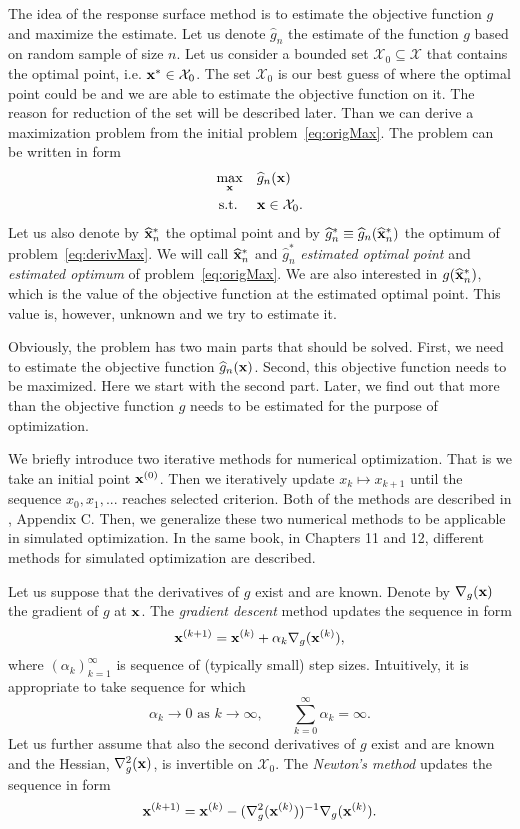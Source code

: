 The idea of the response surface method is to estimate the objective function $g$ and maximize the estimate. Let us denote $\widehat{g}_n$ the estimate of the function $g$ based on random sample of size $n$. Let us consider a bounded set $\mathcal{X}_0 \subseteq \mathcal{X}$ that contains the optimal point, i.e. $\mathbf{x}^{*} \in \mathcal{X}_0$. The set $\mathcal{X}_0$ is our best guess of where the optimal point could be and we are able to estimate the objective function on it. The reason for reduction of the set will be described later. Than we can derive a maximization problem from the initial problem~\eqref{eq:origMax}. The problem can be written in form
\begin{equation}
	\label{eq:derivMax}
	\begin{aligned}
		& \underset{\mathbf{x}}{\max} & & \widehat{g}_n (\mathbf{x}) \\
		& \operatorname{\textrm{s.t.}} & & \mathbf{x} \in \mathcal{X}_0.
	\end{aligned}
\end{equation}
Let us also denote by $\widehat{\mathbf{x}}^{*}_n$ the optimal point and by $ \widehat{g}^{*}_n \equiv \widehat{g}_n (\widehat{\mathbf{x}}^{*}_n)$ the optimum of problem~\eqref{eq:derivMax}. We will call $\widehat{\mathbf{x}}^{*}_n$ and $\widehat{g}^{*}_n$ \emph{estimated optimal point} and \emph{estimated optimum} of problem~\eqref{eq:origMax}. We are also interested in $g (\widehat{\mathbf{x}}^{*}_n)$, which is the value of the objective function at the estimated optimal point. This value is, however, unknown and we try to estimate it.

Obviously, the problem has two main parts that should be solved. First, we need to estimate the objective function $\widehat{g}_n (\mathbf{x})$. Second, this objective function needs to be maximized. Here we start with the second part. Later, we find out that more than the objective function $g$ needs to be estimated for the purpose of optimization.

We briefly introduce two iterative methods for numerical optimization. That is we take an initial point $\mathbf{x}^{(0)}$. Then we iteratively update $x_k \mapsto x_{k+1}$ until the sequence $x_0, x_1, ...$ reaches selected criterion. Both of the methods are described in \cite{Kroese11}, Appendix C. Then, we generalize these two numerical methods to be applicable in simulated optimization. In the same book, in Chapters 11 and 12, different methods for simulated optimization are described. 

Let us suppose that the derivatives of $g$ exist and are known. Denote by $\nabla_{g} (\mathbf{x})$ the gradient of $g$ at $\mathbf{x}$. The \emph{gradient descent} method updates the sequence in form
\[
	\mathbf{x}^{(k+1)} = \mathbf{x}^{(k)} + \alpha_k \nabla_{g} (\mathbf{x}^{(k)}),
\]
where $(\alpha_k)_{k=1}^{\infty}$ is sequence of (typically small) step sizes. Intuitively, it is appropriate to take sequence for which
\[
	\alpha_k \to 0 \text{ as } k \to \infty, \qquad \sum_{k=0}^{\infty} \alpha_k = \infty.
\]
Let us further assume that also the second derivatives of $g$ exist and are known and the Hessian, $\nabla^2_{g} (\mathbf{x})$, is invertible on $\mathcal{X}_0$. The \emph{Newton's method} updates the sequence in form
\[
	\mathbf{x}^{(k+1)} = \mathbf{x}^{(k)} - (\nabla^2_{g} (\mathbf{x}^{(k)}))^{-1} \nabla_{g} (\mathbf{x}^{(k)}).
\]

